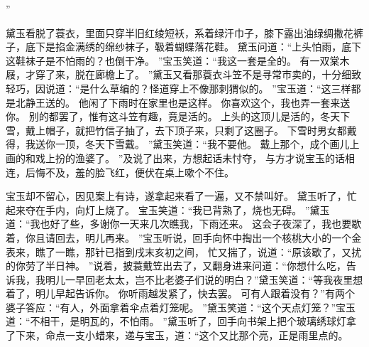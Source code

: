 ”\par
黛玉看脱了蓑衣，里面只穿半旧红绫短袄，系着绿汗巾子，膝下露出油绿绸撒花裤子，底下是掐金满绣的绵纱袜子，靸着蝴蝶落花鞋。
黛玉问道：“上头怕雨，底下这鞋袜子是不怕雨的？也倒干净。
”宝玉笑道：“我这一套是全的。
有一双棠木屐，才穿了来，脱在廊檐上了。
”黛玉又看那蓑衣斗笠不是寻常市卖的，十分细致轻巧，因说道：“是什么草编的？怪道穿上不像那刺猬似的。
”宝玉道：“这三样都是北静王送的。
他闲了下雨时在家里也是这样。
你喜欢这个，我也弄一套来送你。
别的都罢了，惟有这斗笠有趣，竟是活的。
上头的这顶儿是活的，冬天下雪，戴上帽子，就把竹信子抽了，去下顶子来，只剩了这圈子。
下雪时男女都戴得，我送你一顶，冬天下雪戴。
”黛玉笑道：“我不要他。
戴上那个，成个画儿上画的和戏上扮的渔婆了。
”及说了出来，方想起话未忖夺，
与方才说宝玉的话相连，后悔不及，羞的脸飞红，便伏在桌上嗽个不住。
\par
宝玉却不留心，因见案上有诗，遂拿起来看了一遍，又不禁叫好。
黛玉听了，忙起来夺在手内，向灯上烧了。
宝玉笑道：“我已背熟了，烧也无碍。
”黛玉道：“我也好了些，多谢你一天来几次瞧我，下雨还来。
这会子夜深了，我也要歇着，你且请回去，明儿再来。
”宝玉听说，回手向怀中掏出一个核桃大小的一个金表来，瞧了一瞧，那针已指到戌末亥初之间，
忙又揣了，说道：“原该歇了，又扰的你劳了半日神。
”说着，披蓑戴笠出去了，又翻身进来问道：“你想什么吃，告诉我，我明儿一早回老太太，岂不比老婆子们说的明白？”黛玉笑道：“等我夜里想着了，明儿早起告诉你。
你听雨越发紧了，快去罢。
可有人跟着没有？”有两个婆子答应：“有人，外面拿着伞点着灯笼呢。
”黛玉笑道：“这个天点灯笼？”宝玉道：“不相干，是明瓦的，不怕雨。
”黛玉听了，回手向书架上把个玻璃绣球灯拿了下来，命点一支小蜡来，递与宝玉，道：“这个又比那个亮，正是雨里点的。
